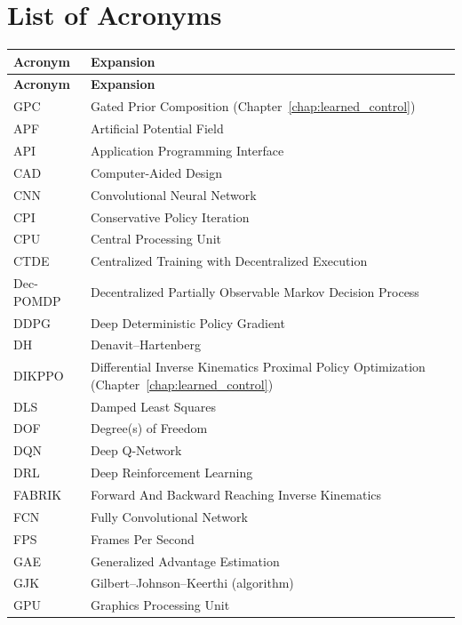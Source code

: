 \cleardoublepage
\chapter*{List of Acronyms}
\makeatletter
{}
\makeatother

\begin{xltabular}{\textwidth}{@{}l X@{}}
\toprule
\textbf{Acronym} & \textbf{Expansion} \\
\midrule
\endfirsthead
\toprule
\textbf{Acronym} & \textbf{Expansion} \\
\midrule
\endhead
\bottomrule
\endfoot
GPC & Gated Prior Composition (Chapter~\ref{chap:learned_control}) \\
APF & Artificial Potential Field \\
API & Application Programming Interface \\
CAD & Computer-Aided Design \\
CNN & Convolutional Neural Network \\
CPI & Conservative Policy Iteration \\
CPU & Central Processing Unit \\
CTDE & Centralized Training with Decentralized Execution \\
Dec-POMDP & Decentralized Partially Observable Markov Decision Process \\
DDPG & Deep Deterministic Policy Gradient \\
DH & Denavit--Hartenberg \\
DIKPPO & Differential Inverse Kinematics Proximal Policy Optimization (Chapter~\ref{chap:learned_control}) \\
DLS & Damped Least Squares \\
DOF & Degree(s) of Freedom \\
DQN & Deep Q-Network \\
DRL & Deep Reinforcement Learning \\
FABRIK & Forward And Backward Reaching Inverse Kinematics \\
FCN & Fully Convolutional Network \\
FPS & Frames Per Second \\
GAE & Generalized Advantage Estimation \\
GJK & Gilbert--Johnson--Keerthi (algorithm) \\
GPU & Graphics Processing Unit \\

\end{xltabular}
